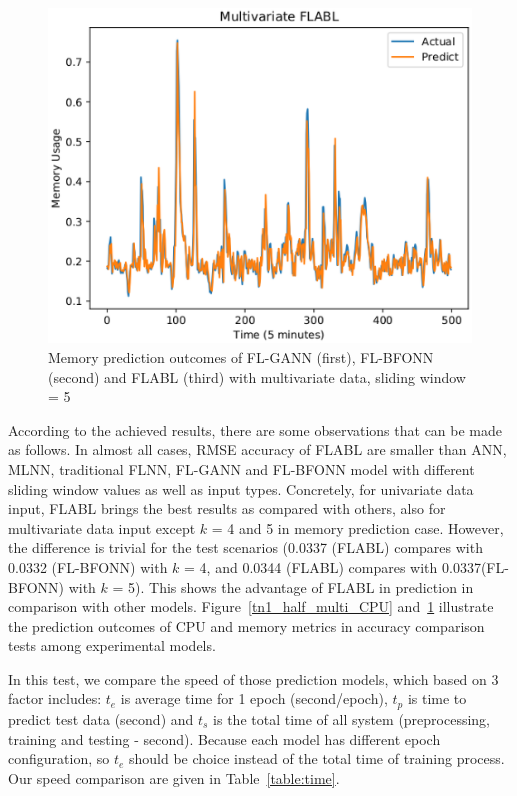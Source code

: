 \documentclass[runningheads]{llncs}
\begin{document}
\begin{figure}[!ht]
\begin{minipage}[t]{4cm}
		\includegraphics[width=1\textwidth]{images/pdf/multi_ram_flabl.eps}
	\end{minipage}
	\caption{Memory prediction outcomes of FL-GANN (first), FL-BFONN (second) and FLABL (third) with multivariate data, sliding window = 5} 
	\label{tn1_half_multi_RAM}
\end{figure}

According to the achieved results, there are some observations that can be made as follows. In almost all cases, RMSE accuracy of FLABL are smaller than ANN, MLNN, traditional FLNN, FL-GANN and FL-BFONN model with different sliding window values as well as input types. Concretely, for univariate data input, FLABL brings the best results as compared with others, also for multivariate data input except $k$ = 4 and 5 in memory prediction case. However, the difference is trivial for the test scenarios (0.0337 (FLABL) compares with 0.0332 (FL-BFONN) with $k$ = 4, and 0.0344 (FLABL) compares with 0.0337(FL-BFONN) with $k$ = 5). This shows the advantage of FLABL in prediction in comparison with other models. Figure~\ref{tn1_half_multi_CPU} and~\ref{tn1_half_multi_RAM} illustrate the prediction outcomes of CPU and memory metrics in accuracy comparison tests among experimental models.

In this test, we compare the speed of those prediction models, which based on 3 factor includes: $t_e$ is average time for 1 epoch (second/epoch), $t_p$ is time to predict test data (second) and $t_s$ is the total time of all system (preprocessing, training and testing - second). Because each model has different epoch configuration, so $t_e$ should be choice instead of the total time of training process.  Our speed comparison are given in Table~\ref{table:time}.
\end{document}

